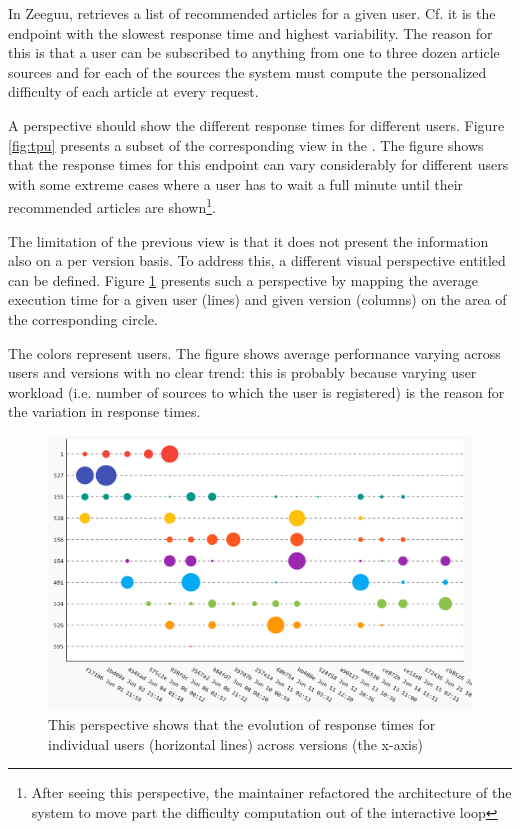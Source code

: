 \documentclass[conference]{IEEEtran}
\begin{document}



In Zeeguu, \epFeedItems retrieves a list of recommended articles for a given user. Cf.  it is the endpoint with the slowest response time and highest variability. The reason for this is that a user can be subscribed to anything from one to three dozen article sources and for each of the sources the system must compute the personalized difficulty of each article at every request. 


A  perspective should show the different response times for different users. Figure \ref{fig:tpu} presents a subset of the corresponding view in the \tool. The figure shows that the response times for this endpoint can vary considerably for different users with some extreme cases where a user has to wait a full minute until their recommended articles are shown\footnote{After seeing this perspective, the maintainer refactored the architecture of the system to move part the difficulty computation out of the interactive loop}.



The limitation of the previous view is that it does not present the information also on a per version basis. To address this, a different visual perspective entitled  can be defined. Figure \ref{fig:tuv} presents such a perspective by mapping the average execution time for a given user (lines) and given version (columns) on the area of the corresponding circle. 


The colors represent users. The figure shows average performance varying  across users and versions with no clear trend: this is probably because varying user workload (i.e. number of sources to which the user is registered) is the reason for the variation in response times. 

\begin{figure}[!ht]
  \centering
  \includegraphics[width=0.7\linewidth]{time_per_user_per_version}
  \caption{This perspective shows that the evolution of response times for individual users (horizontal lines) across versions (the x-axis)}
  \label{fig:tuv}
\end{figure}
\end{document}
